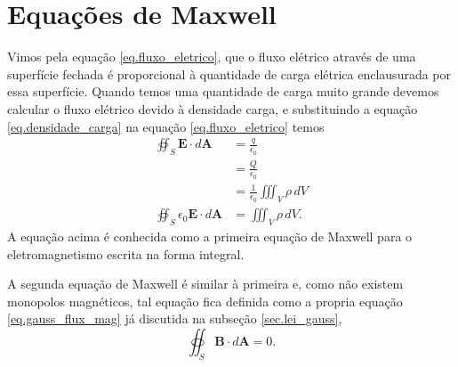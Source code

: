 \section{Equações de Maxwell}
Vimos pela equação \ref{eq.fluxo_eletrico}, que o fluxo elétrico através de uma superfície fechada é proporcional à quantidade de carga elétrica enclausurada por essa superfície. Quando temos uma quantidade de carga muito grande devemos calcular o fluxo elétrico devido à densidade carga, e substituindo a equação \ref{eq.densidade_carga} na equação \ref{eq.fluxo_eletrico} temos
\begin{align*}
\oiint_S\textbf{E}\cdot\textit{d}\textbf{A}&=\frac{q}{\epsilon_0}\\
&=\frac{Q}{\epsilon_0}\\
&=\frac{1}{\epsilon_0}\iiint_{V}\rho\,dV\\
\oiint_S\epsilon_0\textbf{E}\cdot\textit{d}\textbf{A}&=\iiint_{V}\rho\,dV.
\end{align*}
A equação acima é conhecida como a primeira equação de Maxwell para o eletromagnetismo escrita na forma integral. 


A segunda equação de Maxwell é similar à primeira e, como não existem monopolos magnéticos, tal equação fica definida como a propria equação \ref{eq.gauss_flux_mag} já discutida na subseção \ref{sec.lei_gauss},
\begin{equation*}
\oiint_S\textbf{B}\cdot\textit{d}\textbf{A}=0.
\end{equation*}


